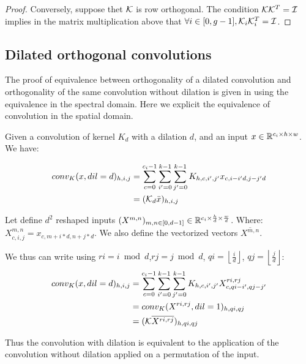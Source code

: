 \begin{proof}
    Conversely, suppose thet $\mathcal{K}$ is row orthogonal. The condition $\mathcal{K}\mathcal{K}^T=\mathcal{I}$ implies in the matrix multiplication above that $\forall i\in[0,g-1], \mathcal{K}_i\mathcal{K}_i^T=\mathcal{I}$.
    \end{proof}
    


\subsection{Dilated orthogonal convolutions}
\label{sec:ap_proof_dilated}

The proof of equivalence between orthogonality of a dilated convolution and orthogonality of the same convolution without dilation is given in \cite{su_scaling-up_2021} using the equivalence in the spectral domain. Here we explicit the equivalence of convolution in the spatial domain.

Given a convolution of kernel $K_d$ with a dilation $d$, and an input $x\in\mathbb{R}^{c_i\times h \times w}$. We have:%

\begin{align*}
conv_K(x,dil=d)_{h,i,j} &= \sum_{c = 0}^{c_{i}-1} \sum_{i' = 0}^{k - 1} \sum_{j' = 0}^{k - 1} K_{h,c,i',j'}x_{c,i-i'd,j-j'd} \\
&= (\mathcal{K}_d\bar{x})_{h,i,j}
\end{align*}

Let define $d^2$ reshaped inputs $(X^{m,n})_{m,n\in[0,d-1]}\in\mathbb{R}^{c_i\times \frac{h}{d}\times \frac{w}{d}}$. Where:
$X^{m,n}_{c,i,j}= x_{c,m+i*d,n+j*d}$. We also define the vectorized vectors $\overline{X^{m,n}}$.

We thus can write using $ri = i\bmod d$,$rj = j\bmod d$, $qi = \left\lfloor \frac{i}{d} \right\rfloor$, $qj = \left\lfloor \frac{j}{d} \right\rfloor$:
\begin{align*}
conv_K(x,dil=d)_{h,i,j} &=\sum_{c = 0}^{c_{i}-1} \sum_{i' = 0}^{k - 1} \sum_{j' = 0}^{k - 1} K_{h,c,i',j'}X^{ri,rj}_{c,qi-i',qj-j'}\\
&= conv_K(X^{ri,rj},dil=1)_{h,qi,qj} \\
&= (\mathcal{K}\overline{X^{ri,rj}})_{h,qi,qj}
\end{align*}

Thus the convolution with dilation is equivalent to the application of the convolution without dilation applied on a permutation of the input. 
